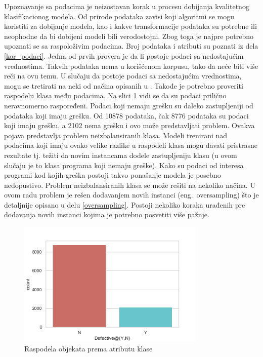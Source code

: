 \documentclass[12pt,oneside]{memoir}
\begin{document}
Upoznavanje sa podacima je neizostavan korak u procesu dobijanja kvalitetnog klasifikacionog modela. Od prirode podataka zavisi koji algoritmi se mogu koristiti za dobijanje modela, kao i kakve transformacije podataka su potrebne ili neophodne da bi dobijeni modeli bili verodostojni.
Zbog toga je najpre potrebno upoznati se sa raspoloživim podacima. Broj podataka i atributi su poznati iz dela \ref{kor_podaci}. Jedna od prvih provera je da li postoje podaci sa nedostajućim vrednostima. Takvih podataka nema u korišćenom korpusu, tako da neće biti više reči na ovu temu. U slučaju da postoje podaci sa nedostajućim vrednostima, mogu se tretirati na neki od načina opisanih u \cite{mitic}. Takođe je potrebno proveriti raspodelu klasa među podacima. Na slici \ref{fig:raspodela} vidi se da su podaci prilično neravnomerno raspoređeni. Podaci koji nemaju grešku su daleko zastupljeniji od podataka koji imaju grešku. Od 10878 podataka, čak 8776 podataka su podaci koji imaju grešku, a 2102 nema grešku i ovo može predstavljati problem. Ovakva pojava predstavlja problem neizbalansiranih klasa. Modeli trenirani nad podacima koji imaju ovako velike razlike u raspodeli klasa mogu davati pristrasne rezultate tj. težiti da novim instancama dodele zastupljeniju klasu (u ovom slučaju je to klasa programa koji nemaju greške). Kako su podaci od interesa programi kod kojih greška postoji takvo ponašanje modela je posebno nedopustivo. Problem neizbalansiranih klasa se može rešiti na nekoliko načina. U ovom radu problem je rešen dodavanjem novih instanci (eng.~oversampling) što je detaljnije opisano u delu \ref{oversampling}. Postoji nekoliko koraka urađenih pre dodavanja novih instanci kojima je potrebno posvetiti više pažnje.  

\begin{figure}[!ht]
  \centering
  \includegraphics[width=0.80\textwidth]{raspodela.png}
  \caption{Raspodela objekata prema atributu klase}
  \label{fig:raspodela}
\end{figure}
	 
\end{document}
